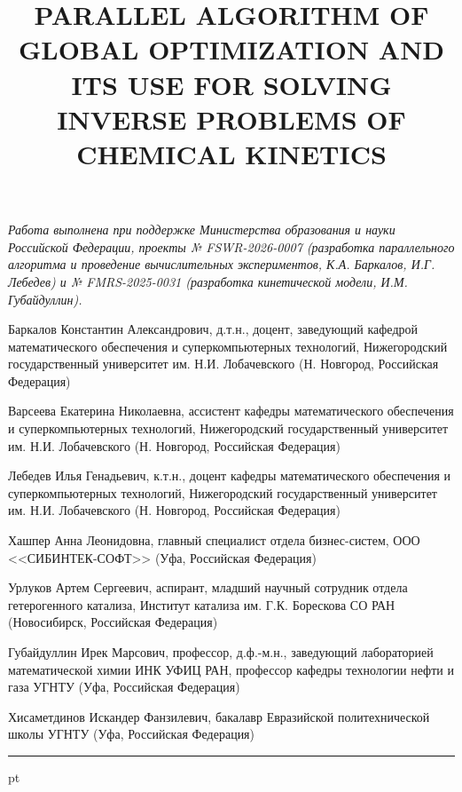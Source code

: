 \documentclass{cmi1}
\begin{document}
\vspace{1em}
{\it Работа выполнена при поддержке Министерства образования и науки Российской Федерации, проекты № FSWR-2026-0007 (разработка параллельного алгоритма и проведение вычислительных экспериментов, К.А. Баркалов, И.Г. Лебедев) и № FMRS-2025-0031 (разработка кинетической модели, И.М. Губайдуллин).}


\insertbiblio

Баркалов Константин Александрович, д.т.н., доцент, заведующий кафедрой математического обеспечения и суперкомпьютерных технологий, Нижегородский государственный университет им. Н.И. Лобачевского (Н. Новгород, Российская Федерация)

Варсеева Екатерина Николаевна, ассистент кафедры математического обеспечения и суперкомпьютерных технологий, Нижегородский государственный университет им. Н.И. Лобачевского (Н. Новгород, Российская Федерация)

Лебедев Илья Генадьевич, к.т.н., доцент кафедры математического обеспечения и суперкомпьютерных технологий, Нижегородский государственный университет им. Н.И. Лобачевского (Н. Новгород, Российская Федерация)

Хашпер Анна Леонидовна, главный специалист отдела бизнес-систем, ООО <<СИБИНТЕК-СОФТ>> (Уфа, Российская Федерация)

Урлуков Артем Сергеевич, аспирант, младший научный сотрудник отдела гетерогенного катализа, Институт катализа им. Г.К. Борескова СО РАН
(Новосибирск, Российская Федерация)

Губайдуллин Ирек Марсович, профессор, д.ф.-м.н., заведующий лабораторией математической химии ИНК УФИЦ РАН, профессор кафедры технологии нефти и газа УГНТУ
(Уфа, Российская Федерация)

Хисаметдинов Искандер Фанзилевич, бакалавр Евразийской политехнической школы УГНТУ (Уфа, Российская Федерация)


\newpage
{\phantom{eee} \hrule {} pt}
\classify{} %

\title{PARALLEL ALGORITHM OF GLOBAL OPTIMIZATION AND ITS USE FOR SOLVING INVERSE PROBLEMS OF CHEMICAL KINETICS}

\end{document}
